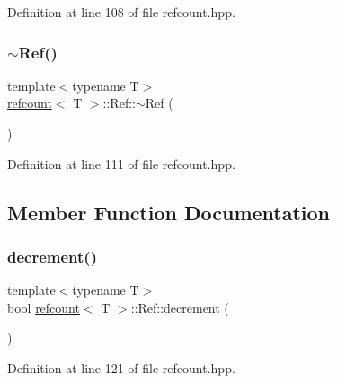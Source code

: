 Definition at line 108 of file refcount.\+hpp.

\mbox{\label{structrefcount_1_1Ref_a12a475bb77a4c7dbc5cfdeceadbfd49f}} 
\subsubsection{\texorpdfstring{$\sim$\+Ref()}{~Ref()}}
{\footnotesize\ttfamily template$<$typename T$>$ \\
\hyperlink{structrefcount}{refcount}$<$ T $>$\+::Ref\+::$\sim$\+Ref (\begin{DoxyParamCaption}{ }\end{DoxyParamCaption})\hspace{0.3cm}{\ttfamily [inline]}}



Definition at line 111 of file refcount.\+hpp.



\subsection{Member Function Documentation}
\mbox{\label{structrefcount_1_1Ref_aca3389ae7d90d2129375f8f33d92a027}} 
\subsubsection{\texorpdfstring{decrement()}{decrement()}}
{\footnotesize\ttfamily template$<$typename T$>$ \\
bool \hyperlink{structrefcount}{refcount}$<$ T $>$\+::Ref\+::decrement (\begin{DoxyParamCaption}{ }\end{DoxyParamCaption})\hspace{0.3cm}{\ttfamily [inline]}}



Definition at line 121 of file refcount.\+hpp.

\mbox{\label{structrefcount_1_1Ref_ae0677f2cf5a1ae75ab7af012f984cbce}} 
